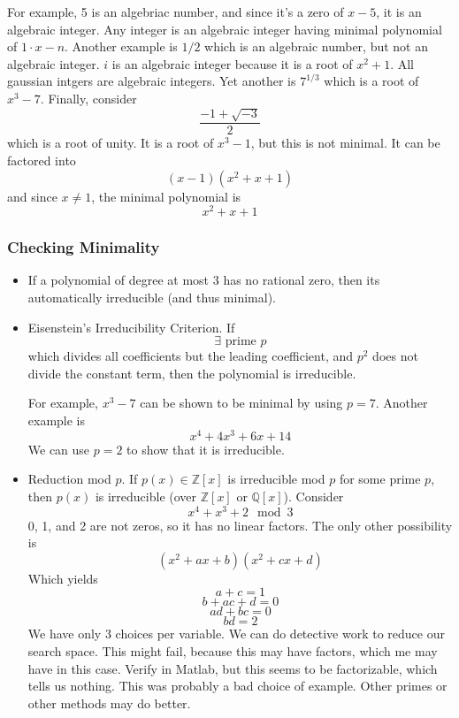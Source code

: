 \documentclass{article}
\begin{document}
For example, 5 is an algebriac number, and since it's a zero of $x - 5$, it
is an algebraic integer. Any integer is an algebraic integer having minimal
polynomial of $1\cdot x - n$. Another example is $1/2$ which is an algebraic
number, but not an algebraic integer. $i$ is an algebraic integer because
it is a root of $x^2 + 1$. All gaussian intgers are algebraic integers. Yet
another is $7^{1/3}$ which is a root of $x^3 - 7$. Finally, consider 
\[ \frac{-1+\sqrt{-3}}{2} \]
which is a root of unity. It is a root of $x^3 -1$, but this is not minimal. It
can be factored into 
\[ (x - 1) (x^2 +x +1) \]
and since $x \neq 1$, the minimal polynomial is
\[ x^2 + x + 1 \]

\subsubsection{Checking Minimality}
\begin{itemize}
\item If a polynomial of degree at most 3 has no rational zero, then its
automatically irreducible (and thus minimal). 

\item Eisenstein's Irreducibility Criterion. If 
\[ \exists \text{ prime } p \]
which divides all coefficients but the leading coefficient, and $p^2$ does not
divide the constant term, then the polynomial is irreducible. 

For example, $x^3 - 7$ can be shown to be minimal by using $p = 7$. Another
example is 
\[ x^4 + 4x^3 +6x + 14 \]
We can use $p = 2$ to show that it is irreducible. 
\item Reduction mod $p$. If $p(x) \in \mathbb{Z}[x]$ is irreducible mod $p$ for
some prime $p$, then $p(x)$ is irreducible (over $\mathbb{Z}[x]$ or
$\mathbb{Q}[x]$). Consider 
\[ x^4 + x^3 + 2 \mod 3 \]
0, 1, and 2 are not zeros, so it has no linear factors. The only other
possibility is 
\[ (x^2 + ax + b)(x^2 + cx + d) \]
Which yields
\[ a +c = 1 \]
\[ b + ac + d = 0 \]
\[ ad + bc = 0 \]
\[ bd = 2 \]
We have only 3 choices per variable. We can do detective work to reduce our
search space. This might fail, because this may have factors, which me may have
in this case. Verify in Matlab, but this seems to be factorizable, which tells
us nothing. This was probably a bad choice of example. Other primes or other
methods may do better. 


\end{itemize}
\end{document}
